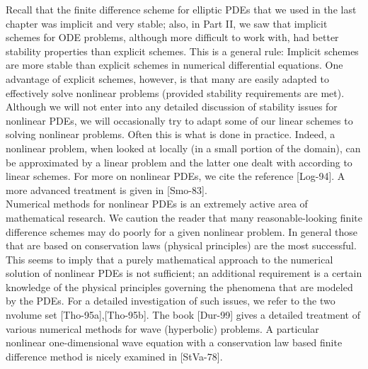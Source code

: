 \documentclass[../main.tex]{subfiles}
\begin{document}
Recall that the finite difference scheme for elliptic PDEs that we used in the last chapter was implicit and very stable; also, in Part II, we saw that implicit schemes for ODE problems, although more difficult to work with, had better stability properties than explicit schemes. This is a general rule: Implicit schemes are more stable than explicit schemes in numerical differential equations. One advantage of explicit schemes, however, is that many are easily adapted to effectively solve nonlinear problems (provided stability requirements are met). Although we will not enter into any detailed discussion of stability issues for nonlinear PDEs, we will occasionally try to adapt some of our linear schemes to solving nonlinear problems. Often this is what is done in practice. Indeed, a nonlinear problem, when looked at locally (in a small portion of the domain), can be approximated by a linear problem and the latter one dealt with according to linear schemes. For more on nonlinear PDEs, we cite the reference [Log-94]. A more advanced treatment is given in [Smo-83].
\\

Numerical methods for nonlinear PDEs is an extremely active area of mathematical research. We caution the reader that many reasonable-looking finite difference schemes may do poorly for a given nonlinear problem. In general those that are based on conservation laws (physical principles) are the most successful. This seems to imply that a purely mathematical approach to the numerical solution of nonlinear PDEs is not sufficient; an additional requirement is a certain knowledge of the physical principles governing the phenomena that are modeled by the PDEs. For a detailed investigation of such issues, we refer to the two nvolume set [Tho-95a],[Tho-95b]. The book [Dur-99] gives a detailed treatment of various numerical methods for wave (hyperbolic) problems. A particular nonlinear one-dimensional wave equation with a conservation law based finite difference method is nicely examined in [StVa-78].
\\
\end{document}
